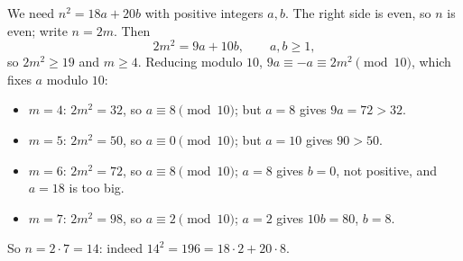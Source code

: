 We need $n^2=18a+20b$ with positive integers $a,b$. The right side is even, so $n$ is even; write $n=2m$. Then
\[
2m^2=9a+10b,\qquad a,b\ge1,
\]
so $2m^2\ge19$ and $m\ge4$. Reducing modulo $10$, $9a\equiv-a\equiv2m^2\pmod{10}$, which fixes $a$ modulo $10$:
\begin{itemize}
\item $m=4$: $2m^2=32$, so $a\equiv8\pmod{10}$; but $a=8$ gives $9a=72>32$.
\item $m=5$: $2m^2=50$, so $a\equiv0\pmod{10}$; but $a=10$ gives $90>50$.
\item $m=6$: $2m^2=72$, so $a\equiv8\pmod{10}$; $a=8$ gives $b=0$, not positive, and $a=18$ is too big.
\item $m=7$: $2m^2=98$, so $a\equiv2\pmod{10}$; $a=2$ gives $10b=80$, $b=8$.
\end{itemize}
So $n=2\cdot7=\boxed{14}$: indeed $14^2=196=18\cdot2+20\cdot8$.

